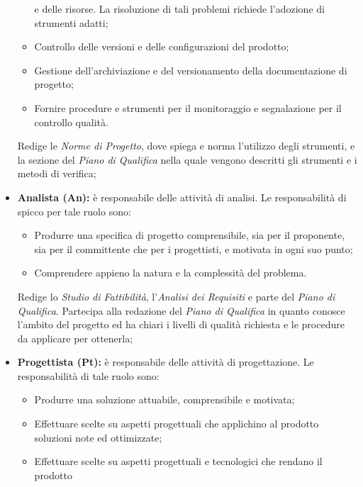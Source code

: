\begin{itemize}
\begin{itemize}
e delle risorse. La risoluzione di tali problemi richiede l'adozione di strumenti adatti; \\
				\item Controllo delle versioni e delle configurazioni del prodotto; \\
				\item Gestione dell'archiviazione e del versionamento della documentazione di progetto; \\
				\item Fornire procedure e strumenti per il monitoraggio e segnalazione per il controllo
qualità. \\
			\end{itemize}
			Redige le \textit{Norme di Progetto}, dove spiega e norma l'utilizzo degli strumenti, e la sezione del \textit{Piano di Qualifica} nella quale vengono descritti gli strumenti e i metodi di verifica;
			\item \textbf{Analista (An):} è responsabile delle attività di analisi. Le responsabilità di spicco per tale ruolo sono: \\
			\begin{itemize}
				\item Produrre una specifica di progetto comprensibile, sia per il proponente, sia per il committente che per i progettisti, e motivata in ogni suo punto; \\
				\item  Comprendere appieno la natura e la complessità del problema. \\
			\end{itemize}
			Redige lo \textit{Studio di Fattibilità}, l'\textit{Analisi dei Requisiti} e parte del \textit{Piano di Qualifica}. Partecipa alla redazione del \textit{Piano di Qualifica} in quanto conosce l'ambito del progetto ed ha chiari i livelli di qualità richiesta e le procedure da applicare per ottenerla;
			\item \textbf{Progettista (Pt):} è responsabile delle attività di progettazione.
Le responsabilità di tale ruolo sono: \\
			\begin{itemize}
				\item Produrre una soluzione attuabile, comprensibile e motivata; \\
				\item Effettuare scelte su aspetti progettuali che applichino al prodotto soluzioni
note ed ottimizzate; \\
				\item Effettuare scelte su aspetti progettuali e tecnologici che rendano il prodotto

\end{itemize}
\end{itemize}

